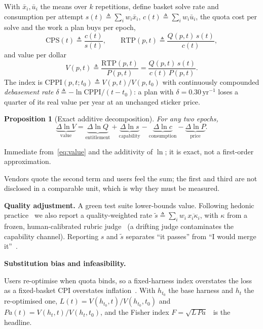 \documentclass[conference]{IEEEtran}
\theoremstyle{plain}
\newtheorem{proposition}{Proposition}
\theoremstyle{definition}
\newcommand{\RTP}{\ensuremath{\mathrm{RTP}}}
\newcommand{\CPS}{\ensuremath{\mathrm{CPS}}}
\newcommand{\CPPI}{\ensuremath{\mathrm{CPPI}}}
\newcommand{\eqdef}{\ensuremath{\triangleq}}
\begin{document}
With $\bar x_i,\bar u_i$ the means
over $k$ repetitions, define basket solve rate and consumption per attempt
$s(t)\eqdef\sum_i w_i\bar x_i$, $c(t)\eqdef\sum_i w_i\bar u_i$, the quota cost
per solve and the work a plan buys per epoch,
\begin{equation}
\CPS(t) \eqdef \frac{c(t)}{s(t)}, \qquad
\RTP(p,t) \eqdef \frac{Q(p,t)\, s(t)}{c(t)},
\label{eq:rtp}
\end{equation}
and value per dollar
\begin{equation}
V(p,t) \eqdef \frac{\RTP(p,t)}{P(p,t)} = \frac{Q(p,t)\,s(t)}{c(t)\,P(p,t)} .
\label{eq:value}
\end{equation}
The index is $\CPPI(p,t;t_0)\eqdef V(p,t)/V(p,t_0)$ with continuously
compounded \emph{debasement rate} $\delta\eqdef-\ln\CPPI/(t-t_0)$: a plan with
$\delta=0.30\,\text{yr}^{-1}$ loses a quarter of its real value per year at an
unchanged sticker price.

\begin{proposition}[Exact additive decomposition]
\label{prop:decomp}
For any two epochs,
\begin{equation}
\underbrace{\Delta \ln V}_{\text{value}} =
\underbrace{\Delta \ln Q}_{\text{entitlement}} +
\underbrace{\Delta \ln s}_{\text{capability}} -
\underbrace{\Delta \ln c}_{\text{consumption}} -
\underbrace{\Delta \ln P}_{\text{price}} .
\label{eq:decomp}
\end{equation}
\end{proposition}
\begin{IEEEproof}
Immediate from~\eqref{eq:value} and the additivity of $\ln$; it is exact, not
a first-order approximation.
\end{IEEEproof}

Vendors quote the second term and users feel the sum; the first and third are
not disclosed in a comparable unit, which is why they must be measured.

\textbf{Quality adjustment.} A green test suite lower-bounds value. Following
hedonic practice~\cite{triplett2006hedonic} we also report a quality-weighted
rate $\tilde s\eqdef\sum_i w_i\,\overline{x_i\kappa_i}$, with $\kappa$ from a
frozen, human-calibrated rubric judge~\cite{zheng2023judge} (a drifting judge
contaminates the capability channel). Reporting $s$ and $\tilde s$ separates
``it passes'' from ``I would merge it''~\cite{metr2025slowdown}.

\textbf{Substitution bias and infeasibility.}

Users re-optimise when quota binds, so a fixed-harness index overstates the
loss as a fixed-basket CPI overstates inflation~\cite{boskin1996toward}. With
$h_{t_0}$ the base harness and $h_t$ the re-optimised one,
$L(t)=V(h_{t_0},t)/V(h_{t_0},t_0)$ and $Pa(t)=V(h_t,t)/V(h_t,t_0)$, and the
Fisher index $F=\sqrt{L\,Pa}$~\cite{fisher1922index} is the headline.
\end{document}

